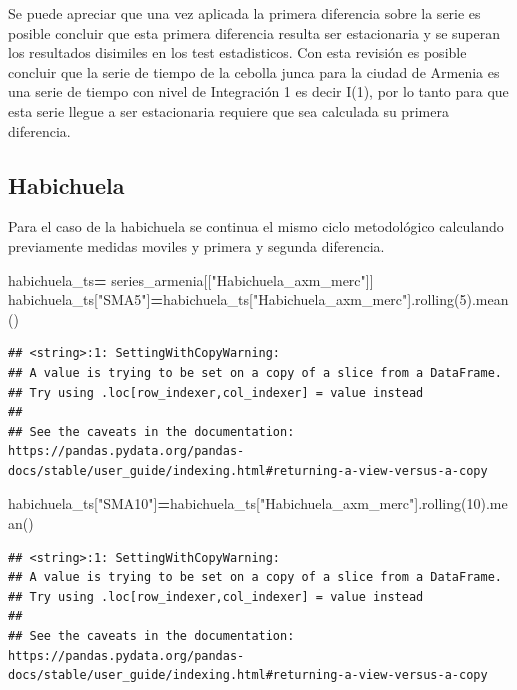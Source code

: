 \documentclass[
]{book}
\newenvironment{Shaded}{\begin{snugshade}}{\end{snugshade}}
\newcommand{\DecValTok}[1]{\textcolor[rgb]{0.00,0.00,0.81}{#1}}
\newcommand{\NormalTok}[1]{#1}
\newcommand{\OperatorTok}[1]{\textcolor[rgb]{0.81,0.36,0.00}{\textbf{#1}}}
\newcommand{\StringTok}[1]{\textcolor[rgb]{0.31,0.60,0.02}{#1}}
\begin{document}
Se puede apreciar que una vez aplicada la primera diferencia sobre la serie es posible concluir que esta primera diferencia resulta ser estacionaria y se superan los resultados disimiles en los test estadisticos. Con esta revisión es posible concluir que la serie de tiempo de la cebolla junca para la ciudad de Armenia es una serie de tiempo con nivel de Integración 1 es decir I(1), por lo tanto para que esta serie llegue a ser estacionaria requiere que sea calculada su primera diferencia.

\hypertarget{habichuela}{%
\subsection{Habichuela}\label{habichuela}}

Para el caso de la habichuela se continua el mismo ciclo metodológico calculando previamente medidas moviles y primera y segunda diferencia.

\begin{Shaded}
\begin{Highlighting}[]

\NormalTok{habichuela\_ts}\OperatorTok{=}\NormalTok{ series\_armenia[[}\StringTok{"Habichuela\_axm\_merc"}\NormalTok{]]}
\NormalTok{habichuela\_ts[}\StringTok{"SMA5"}\NormalTok{]}\OperatorTok{=}\NormalTok{habichuela\_ts[}\StringTok{"Habichuela\_axm\_merc"}\NormalTok{].rolling(}\DecValTok{5}\NormalTok{).mean()}
\end{Highlighting}
\end{Shaded}

\begin{verbatim}
## <string>:1: SettingWithCopyWarning: 
## A value is trying to be set on a copy of a slice from a DataFrame.
## Try using .loc[row_indexer,col_indexer] = value instead
## 
## See the caveats in the documentation: https://pandas.pydata.org/pandas-docs/stable/user_guide/indexing.html#returning-a-view-versus-a-copy
\end{verbatim}

\begin{Shaded}
\begin{Highlighting}[]
\NormalTok{habichuela\_ts[}\StringTok{"SMA10"}\NormalTok{]}\OperatorTok{=}\NormalTok{habichuela\_ts[}\StringTok{"Habichuela\_axm\_merc"}\NormalTok{].rolling(}\DecValTok{10}\NormalTok{).mean()}
\end{Highlighting}
\end{Shaded}

\begin{verbatim}
## <string>:1: SettingWithCopyWarning: 
## A value is trying to be set on a copy of a slice from a DataFrame.
## Try using .loc[row_indexer,col_indexer] = value instead
## 
## See the caveats in the documentation: https://pandas.pydata.org/pandas-docs/stable/user_guide/indexing.html#returning-a-view-versus-a-copy
\end{verbatim}
\end{document}
